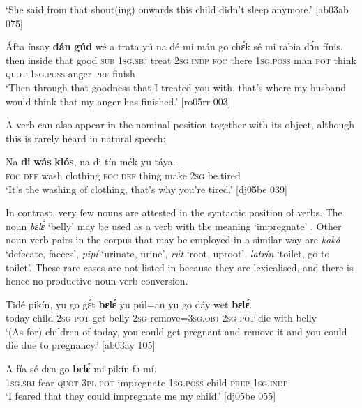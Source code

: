 \glt ‘She said from that shout(ing) onwards this child didn’t sleep anymore.’ [ab03ab 075]
\z


\ea%
    \label{ex:key:105}
    \gll \'{A}fta    ínsay  \textbf{dán}    \textbf{gúd}    wé  a    trata  yú    na  dé
mi    mán    go  chɛ́k  sé    mi    rabia  dɔ́n  fínis.\\
then  inside  that    good  \textsc{sub}  \textsc{1sg.sbj}  treat  \textsc{2sg.indp}  \textsc{foc}  there
\textsc{1sg.poss}  man    \textsc{pot}  think  \textsc{quot}    \textsc{1sg.poss}  anger  \textsc{prf}  finish\\
\glt ‘Then through that goodness that I treated you with, that’s where my 
husband would think that my anger has finished.’ [ro05rr 003]
\z

A verb can also appear in the nominal position together with its object, although this is rarely heard in natural speech: 


\ea%
    \label{ex:key:106}
    \gll Na  \textbf{di}  \textbf{wás}    \textbf{klós},  na  di  tín    mék    yu  táya.\\
\textsc{foc}  \textsc{def}  wash  clothing  \textsc{foc}  \textsc{def}  thing  make  \textsc{2sg}  be.tired\\

\glt ‘It’s the washing of clothing, that’s why you’re tired.’ [dj05be 039]
\z

In contrast, very few nouns are attested in the syntactic position of verbs. The noun \textit{bɛlɛ́} ‘belly’  may be used as a verb with the meaning ‘impregnate’ . Other noun-verb pairs in the corpus that may be employed in a similar way are \textit{kaká} ‘defecate, faeces’, \textit{pipí} ‘urinate, urine’, \textit{rút} ‘root, uproot’, \textit{latrín} ‘toilet, go to toilet’. These rare cases are not listed in  because they are lexicalised, and there is hence no productive noun-verb conversion. 


\ea%
    \label{ex:key:107}
    \gll Tidé    pikín,  yu  go  gɛ́t  \textbf{bɛlɛ́}    yu  púl=an
yu  go  dáy  wet    \textbf{bɛlɛ́}.\\
today  child  \textsc{2sg}  \textsc{pot}  get  belly  \textsc{2sg}  remove=\textsc{3sg.obj}
\textsc{2sg}  \textsc{pot}  die  with    belly\\

\glt ‘(As for) children of today, you could get pregnant and remove it 
and you could die due to pregnancy.’ [ab03ay 105]
\z


\ea%
    \label{ex:key:108}
    \gll A    fía  sé    dɛn  go  \textbf{bɛlɛ́}      mi    pikín  fɔ  mí.\\
  \textsc{1sg.sbj}  fear  \textsc{quot}    \textsc{3pl}  \textsc{pot}  impregnate  \textsc{1sg.poss}  child  \textsc{prep}  \textsc{1sg.indp}\\
\glt ‘I feared that they could impregnate me my child.’ [dj05be 055]
\z

